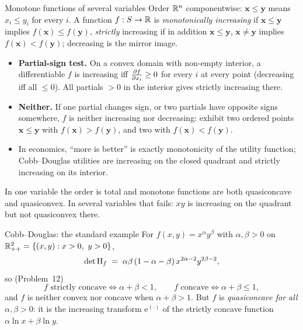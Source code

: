 \begin{rulebox}{Monotone functions of several variables}
Order $\mathbb{R}^{n}$ componentwise: $\mathbf{x}\le\mathbf{y}$ means
$x_i\le y_i$ for every $i$. A function $f:S\to\mathbb{R}$ is \emph{monotonically
increasing}  if $\mathbf{x}\le\mathbf{y}$ implies
$f(\mathbf{x})\le f(\mathbf{y})$, \emph{strictly} increasing if in addition
$\mathbf{x}\le\mathbf{y}$, $\mathbf{x}\neq\mathbf{y}$ implies
$f(\mathbf{x})<f(\mathbf{y})$; decreasing is the mirror image.
\begin{itemize}[leftmargin=1.6em,itemsep=0.3ex]
  \item \textbf{Partial-sign test.} On a convex domain with non-empty
        interior, a differentiable $f$ is increasing iff
        $\frac{\partial f}{\partial x_i}\ge0$ for every $i$ at every point (decreasing iff all
        $\le0$). All partials $>0$ in the interior gives strictly
        increasing there.
  \item \textbf{Neither.} If one partial changes sign, or two partials have
        opposite signs somewhere, $f$ is neither increasing nor decreasing:
        exhibit two ordered points $\mathbf{x}\le\mathbf{y}$ with
        $f(\mathbf{x})>f(\mathbf{y})$, and two with $f(\mathbf{x})<f(\mathbf{y})$.
  \item In economics, ``more is better'' is exactly monotonicity of the
        utility function; Cobb--Douglas utilities are increasing on the
        closed quadrant and strictly increasing on its interior.
\end{itemize}
In one variable the order is total and monotone functions are both
quasiconcave and quasiconvex. In several variables that fails: $xy$ is
increasing on the quadrant but not quasiconvex there.
\end{rulebox}

\begin{rulebox}{Cobb--Douglas: the standard example}
For $f(x,y)=x^{\alpha}y^{\beta}$ with $\alpha,\beta>0$ on
$\R^{2}_{++}=\{(x,y):x>0,\ y>0\}$,
\[
  \det\operatorname{H}_f \;=\; \alpha\beta\,(1-\alpha-\beta)\,x^{2\alpha-2}y^{2\beta-2},
\]
so (Problem~12)
\[
  f \text{ strictly concave} \iff \alpha+\beta<1, \qquad
  f \text{ concave} \iff \alpha+\beta\le1,
\]
and $f$ is neither convex nor concave when $\alpha+\beta>1$. But $f$ is
\emph{quasiconcave for all} $\alpha,\beta>0$: it is the increasing
transform $\mathrm{e}^{(\cdot)}$ of the strictly concave function
$\alpha\ln x+\beta\ln y$.
\end{rulebox}


